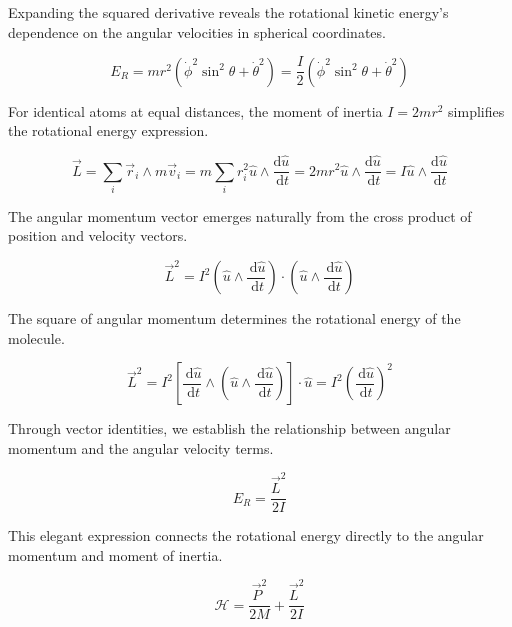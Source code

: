 Expanding the squared derivative reveals the rotational kinetic energy's dependence on the angular velocities in spherical coordinates.

\begin{equation}
E_{R}=m r^{2}\left(\dot{\phi}^{2} \sin ^{2} \theta+\dot{\theta}^{2}\right)=\frac{I}{2}\left(\dot{\phi}^{2} \sin ^{2} \theta+\dot{\theta}^{2}\right)
\end{equation}

For identical atoms at equal distances, the moment of inertia $I=2mr^2$ simplifies the rotational energy expression.

\begin{equation}
\vec{L}=\sum_{i} \vec{r}_{i} \wedge m \vec{v}_{i}=m \sum_{i} r_{i}^{2} \hat{u} \wedge \frac{\mathrm{d} \hat{u}}{\, \mathrm{d} t}=2 m r^{2} \hat{u} \wedge \frac{\mathrm{d} \hat{u}}{\, \mathrm{d} t}=I \hat{u} \wedge \frac{\mathrm{d} \hat{u}}{\, \mathrm{d} t}
\end{equation}

The angular momentum vector emerges naturally from the cross product of position and velocity vectors.

\begin{equation}
\vec{L}^{2}=I^{2}\left(\hat{u} \wedge \frac{\, \mathrm{d} \hat{u}}{\, \mathrm{d} t}\right) \cdot\left(\hat{u} \wedge \frac{\, \mathrm{d} \hat{u}}{\, \mathrm{d} t}\right)
\end{equation}

The square of angular momentum determines the rotational energy of the molecule.

\begin{equation}
\vec{L}^{2}=I^{2}\left[\frac{\, \mathrm{d} \hat{u}}{\, \mathrm{d} t} \wedge\left(\hat{u} \wedge \frac{\, \mathrm{d} \hat{u}}{\, \mathrm{d} t}\right)\right] \cdot \hat{u}=I^{2}\left(\frac{\, \mathrm{d} \hat{u}}{\, \mathrm{d} t}\right)^{2}
\end{equation}

Through vector identities, we establish the relationship between angular momentum and the angular velocity terms.

\begin{equation}
E_{R}=\frac{\vec{L}^{2}}{2 I}
\end{equation}

This elegant expression connects the rotational energy directly to the angular momentum and moment of inertia.

\begin{equation}
\mathcal{H}=\frac{\vec{P}^{2}}{2 M}+\frac{\vec{L}^{2}}{2 I}
\end{equation}

